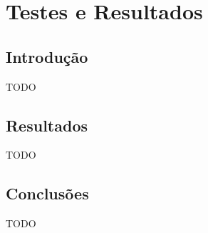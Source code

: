 \chapter{Testes e Resultados}
\label{ch::test-result}

\section{Introdução}
\label{sec::test-result:intro}

TODO


\section{Resultados}
\label{sec::test-result:result}

TODO


\section{Conclusões}
\label{chap4:sec:concs}
\label{sec::estado-arte:concs}

TODO